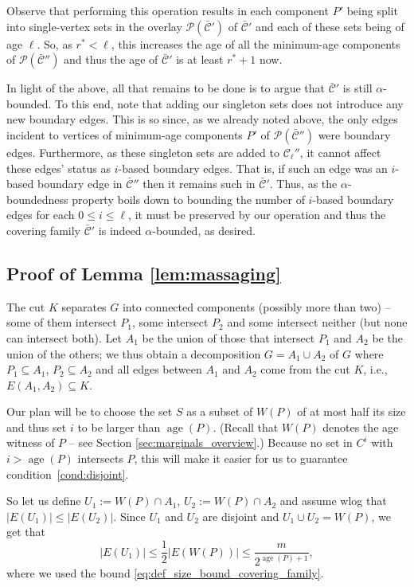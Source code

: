 \documentclass[11pt, letterpaper]{article}
\DeclareMathOperator{\age}{age}
\newcommand{\cC}{\mathcal{C}}
\newcommand{\ocC}{\bar{\mathcal{C}}}
\newcommand{\cP}{\mathcal{P}}
\newcommand{\cut}{{K}}
\begin{document}
Observe that performing this operation results in each component $P'$ being split into single-vertex sets in the overlay $\cP(\ocC')$ of $\ocC'$ and each of these sets being of age $\ell$. So, as $r^*<\ell$, this increases the age of all the minimum-age components of $\cP(\ocC'')$ and thus the age of $\ocC'$ is at least $r^*+1$ now.

In light of the above, all that remains to be done is to argue that $\ocC'$ is still $\alpha$-bounded. To this end, note that adding our singleton sets does not introduce any new boundary edges. This is so since, as we already noted above, the only edges incident to vertices of minimum-age components $P'$ of $\cP(\ocC'')$ were boundary edges. Furthermore, as these singleton sets are added to $\cC_\ell''$, it cannot affect these edges' status as $i$-based boundary edges. That is, if such an edge was an $i$-based boundary edge in $\ocC''$ then it remains such in $\ocC'$. Thus, as the $\alpha$-boundedness property boils down to bounding the number of $i$-based boundary edges for each $0\leq i\leq \ell$, it must be preserved by our operation and thus the covering family $\ocC'$ is indeed $\alpha$-bounded, as desired.

\subsection{Proof of Lemma \ref{lem:massaging}} \label{app:massaging}

The cut $\cut$ separates $G$ into connected components (possibly more than two) -- some of them intersect $P_1$, some intersect $P_2$ and some intersect neither (but none can intersect both). Let $A_1$ be the union of those that intersect $P_1$ and $A_2$ be the union of the others; we thus obtain a decomposition $G = A_1 \cup A_2$ of $G$ where $P_1 \subseteq A_1$, $P_2 \subseteq A_2$ and all edges between $A_1$ and $A_2$ come from the cut $\cut$, i.e., $E(A_1,A_2) \subseteq \cut$.

Our plan will be to choose the set $S$ as a subset of $W(P)$ of at most half its size and thus set $i$ to be larger than $\age(P)$. (Recall that $W(P)$ denotes the age witness of $P$ -- see Section \ref{sec:marginals_overview}.) Because no set in $C^i$ with $i > \age(P)$ intersects $P$, this will make it easier for us to guarantee condition~\eqref{cond:disjoint}.

So let us define $U_1 := W(P) \cap A_1$, $U_2 := W(P) \cap A_2$ and assume wlog that $|E(U_1)| \le |E(U_2)|$. 
Since $U_1$ and $U_2$ are disjoint and $U_1 \cup U_2 = W(P)$, we get that
\begin{equation} \label{eq:fresh_color}
|E(U_1)| \le \frac 12 |E(W(P))| \le \frac{m}{2^{\age(P)+1}},
\end{equation}
where we used the bound \eqref{eq:def_size_bound_covering_family}.
\end{document}
